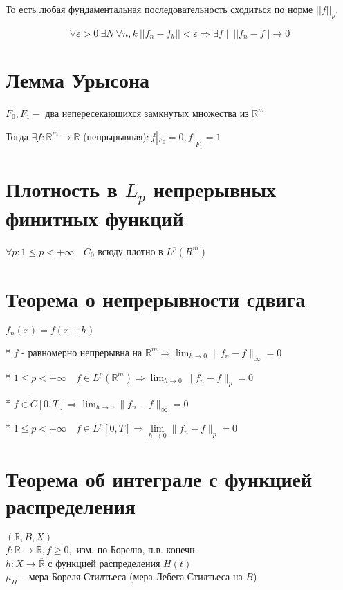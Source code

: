 \documentclass[paper=a4, fontsize=17pt]{article}
\begin{document}
То есть любая фундаментальная последовательность сходиться по норме $ ||f||_p $.

$$ \forall \varepsilon > 0 ~ \exists N ~ \forall n, k ~ ||f_n - f_k|| < \varepsilon \Rightarrow \exists f \mid ~ ||f_n - f|| \rightarrow 0 $$


\section{Лемма Урысона}

$F_0, F_1 - $ два непересекающихся замкнутых множества из $\mathbb{R}^m$

Тогда $\exists f: \mathbb{R}^m \to \mathbb{R}$ (непрырывная)$: f|_{F_0}=0, f|_{F_1}=1$

\section{Плотность в $L_p$ непрерывных финитных функций}

$\forall p: 1 \leqslant p < +\infty \quad C_0$ всюду плотно в $L^p(R^m)$

\section{Теорема о непрерывности сдвига}

$f_n(x) = f(x + h)$

* $f$ - равномерно непрерывна на $\mathbb{R}^m \Rightarrow \displaystyle\lim_{h \to 0} \| f_n - f \|_\infty = 0$

* $1 \leqslant p < +\infty \quad f \in L^p (\mathbb{R}^m) \Rightarrow \displaystyle\lim_{h \to 0} \| f_n - f \|_p = 0$

* $f \in \widetilde{C}[0, T] \Rightarrow \displaystyle\lim_{h \to 0} \| f_n - f \|_\infty = 0$

* $1 \leqslant p < +\infty \quad f \in L^p[0, T] \Rightarrow \lim\limits_{h \to 0} \| f_n - f \|_p = 0$

\section{Теорема об интеграле с функцией распределения}
$(\mathbb{R}, B, X)$ \\
$f:\mathbb{R}\rightarrow\mathbb{R}, f \ge 0,$ изм. по Борелю, п.в. конечн.\\
$h: X \rightarrow \overline{\mathbb{R}}$ с функцией распределения $H(t)$\\ 


$\mu_H$ -- мера Бореля-Стилтьеса (мера Лебега-Стилтьеса на $B$)\\
\end{document}
